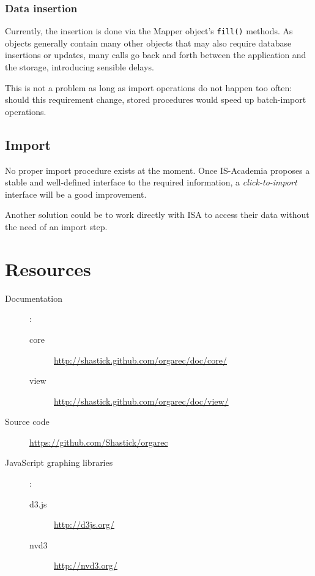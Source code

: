 \subsection{Data insertion}
Currently, the insertion is done via the Mapper object's \verb|fill()| methods. As objects generally contain many other objects that may also require database insertions or updates, many calls go back and forth between the application and the storage, introducing sensible delays.

This is not a problem as long as import operations do not happen too often: should this requirement change, stored procedures would speed up batch-import operations.

\section{Import}
No proper import procedure exists at the moment. Once IS-Academia proposes a stable and well-defined interface to the required information, a \emph{click-to-import} interface will be a good improvement. 

Another solution could be to work directly with ISA to access their data without the need of an import step.
\chapter{Resources}

\begin{description}
\item[Documentation] :
\begin{description}
 \item[core] \url{http://shastick.github.com/orgarec/doc/core/}
 \item[view] \url{http://shastick.github.com/orgarec/doc/view/}
\end{description}
\item[Source code] \url{https://github.com/Shastick/orgarec}
\item[JavaScript graphing libraries] :

\begin{description}
	\item[d3.js] \url{http://d3js.org/}
	\item[nvd3] \url{http://nvd3.org/}
	\end{description}
	
\end{description}


